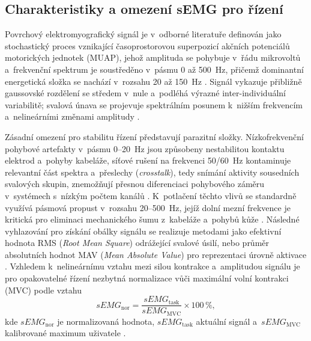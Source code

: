 \subsection{Charakteristiky a omezení sEMG pro řízení}
Povrchový elektromyografický signál je v~odborné literatuře definován jako stochastický proces vznikající časoprostorovou superpozicí akčních potenciálů motorických jednotek (MUAP), jehož amplituda se pohybuje v~řádu mikrovoltů a~frekvenční spektrum je soustředěno v~pásmu 0 až 500~Hz, přičemž dominantní energetická složka se nachází v~rozsahu 20 až 150~Hz \cite{Chowdhury2013917, Reaz2006, Song2023823, Sul2025627}.
Signál vykazuje přibližně gaussovské rozdělení se středem v~nule a~podléhá výrazné inter-individuální variabilitě; svalová únava se projevuje spektrálním posunem k~nižším frekvencím a~nelineárními změnami amplitudy \cite{ALCAN20231026, Lee20241121, Wu2024613}.

Zásadní omezení pro stabilitu řízení představují parazitní složky.
Nízkofrekvenční pohybové artefakty v~pásmu 0–20~Hz jsou způsobeny nestabilitou kontaktu elektrod a~pohyby kabeláže, síťové rušení na frekvenci 50/60~Hz kontaminuje relevantní část spektra a~přeslechy (\textit{crosstalk}), tedy snímání aktivity sousedních svalových skupin, znemožňují přesnou diferenciaci pohybového záměru v~systémech s~nízkým počtem kanálů \cite{ALCAN20231026, Chowdhury2013917, DeLuca2010, Song2023823, Sul2025627}.
K~potlačení těchto vlivů se standardně využívá pásmová propust v~rozsahu 20–500~Hz, jejíž dolní mezní frekvence je kritická pro eliminaci mechanického šumu z~kabeláže a~pohybů kůže \cite{DeLuca2010, Song2023823, Stavdahl2011, Sul2025627}.
Následné vyhlazování pro získání obálky signálu se realizuje metodami jako efektivní hodnota RMS (\textit{Root Mean Square}) odrážející svalové úsilí, nebo průměr absolutních hodnot MAV (\textit{Mean Absolute Value}) pro reprezentaci úrovně aktivace \cite{Sul2025627, Wu2024613}.
Vzhledem k~nelineárnímu vztahu mezi silou kontrakce a~amplitudou signálu je pro opakovatelné řízení nezbytná normalizace vůči maximální volní kontrakci (MVC) podle vztahu
%
\begin{equation}
    sEMG_{\mathrm{nor}} = \frac{sEMG_{\mathrm{task}}}{sEMG_{\mathrm{MVC}}} \times 100\,\%,
\end{equation}
%
kde $sEMG_{\mathrm{nor}}$ je normalizovaná hodnota, $sEMG_{\mathrm{task}}$ aktuální signál a~$sEMG_{\mathrm{MVC}}$ kalibrované maximum uživatele \cite{Wu2024613}.

